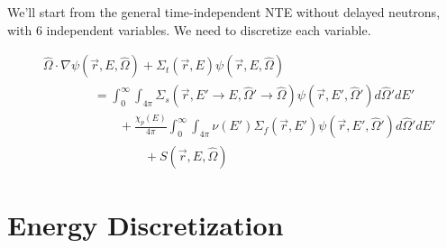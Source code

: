 \documentclass[12pt]{article}
\newcommand{\rvec}{\ensuremath{\vec{r}}}
\newcommand{\omvec}{\ensuremath{\hat{\Omega}}}
\begin{document}






We'll start from the general time-independent NTE without delayed neutrons, with 6 
independent variables. We need to discretize each variable. 

\begin{align}
&\omvec\cdot  \nabla \psi(\rvec,E,\omvec)+
\Sigma_t(\rvec,E)\psi(\rvec,E,\omvec) \nonumber
\\&
\quad\quad\quad\quad =
\int_0^{\infty}\int_{4\pi}
\Sigma_s(\rvec, E'\rightarrow E,\omvec'\rightarrow\omvec)
\psi(\rvec,E',\omvec')d\omvec'dE'
\\&\quad\quad\quad\quad\quad\quad +
\frac{\chi_p(E)}{4\pi}\int_0^{\infty}\int_{4\pi}\nu(E')\Sigma_f(\rvec,E')
\psi(\rvec,E',\omvec')d\omvec'dE'\nonumber
\\&\quad\quad\quad\quad\quad\quad\quad\quad+S(\rvec, E, \omvec)\nonumber
\end{align}

\section*{Energy Discretization}
\end{document}
